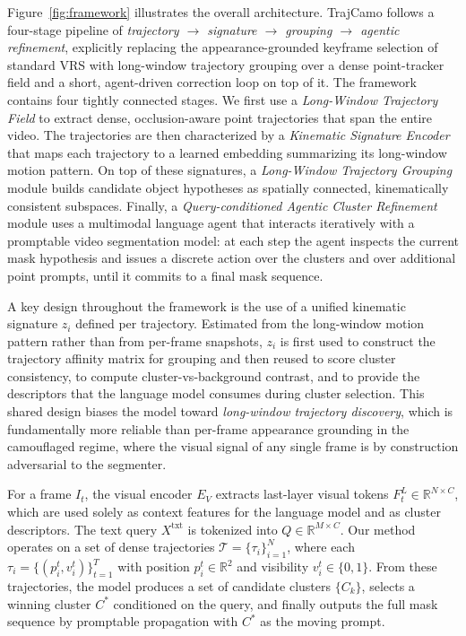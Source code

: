 \documentclass[11pt]{article}
\begin{document}
Figure~\ref{fig:framework} illustrates the overall architecture.
TrajCamo follows a four-stage pipeline of \emph{trajectory $\rightarrow$ signature $\rightarrow$ grouping $\rightarrow$ agentic refinement}, explicitly replacing the appearance-grounded keyframe selection of standard VRS with long-window trajectory grouping over a dense point-tracker field and a short, agent-driven correction loop on top of it.
The framework contains four tightly connected stages.
We first use a \emph{Long-Window Trajectory Field} to extract dense, occlusion-aware point trajectories that span the entire video.
The trajectories are then characterized by a \emph{Kinematic Signature Encoder} that maps each trajectory to a learned embedding summarizing its long-window motion pattern.
On top of these signatures, a \emph{Long-Window Trajectory Grouping} module builds candidate object hypotheses as spatially connected, kinematically consistent subspaces.
Finally, a \emph{Query-conditioned Agentic Cluster Refinement} module uses a multimodal language agent that interacts iteratively with a promptable video segmentation model: at each step the agent inspects the current mask hypothesis and issues a discrete action over the clusters and over additional point prompts, until it commits to a final mask sequence.

A key design throughout the framework is the use of a unified kinematic signature $z_i$ defined per trajectory.
Estimated from the long-window motion pattern rather than from per-frame snapshots, $z_i$ is first used to construct the trajectory affinity matrix for grouping and then reused to score cluster consistency, to compute cluster-vs-background contrast, and to provide the descriptors that the language model consumes during cluster selection.
This shared design biases the model toward \emph{long-window trajectory discovery}, which is fundamentally more reliable than per-frame appearance grounding in the camouflaged regime, where the visual signal of any single frame is by construction adversarial to the segmenter.

For a frame $I_t$, the visual encoder $E_V$ extracts last-layer visual tokens $F_t^L\in\mathbb{R}^{N\times C}$, which are used solely as context features for the language model and as cluster descriptors.
The text query $X^{\mathrm{txt}}$ is tokenized into $Q\in\mathbb{R}^{M\times C}$.
Our method operates on a set of dense trajectories $\mathcal{T}=\{\tau_i\}_{i=1}^{N}$, where each $\tau_i=\{(p_i^t, v_i^t)\}_{t=1}^{T}$ with position $p_i^t\in\mathbb{R}^2$ and visibility $v_i^t\in\{0,1\}$.
From these trajectories, the model produces a set of candidate clusters $\{C_k\}$, selects a winning cluster $C^*$ conditioned on the query, and finally outputs the full mask sequence by promptable propagation with $C^*$ as the moving prompt.
\end{document}
